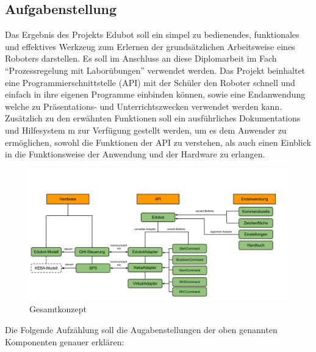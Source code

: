 \subsection{Aufgabenstellung}
Das Ergebnis des Projekts Edubot soll ein simpel zu bedienendes, funktionales und effektives Werkzeug zum Erlernen der grundsätzlichen Arbeitsweise eines Roboters darstellen. Es soll im Anschluss an diese Diplomarbeit im Fach “Prozessregelung mit Laborübungen” verwendet werden. Das Projekt beinhaltet eine Programmierschnittstelle (API) mit der  Schüler den Roboter schnell und einfach in ihre eigenen Programme einbinden können, sowie eine Endanwendung welche zu Präsentations- und Unterrichtszwecken verwendet werden kann.
\\[0.5em]
Zusätzlich zu den erwähnten Funktionen soll ein ausführliches Dokumentations und Hilfesystem m zur Verfügung gestellt werden, um es dem Anwender zu ermöglichen, sowohl die Funktionen der API zu verstehen, als auch einen Einblick in die Funktionsweise der Anwendung und der Hardware zu erlangen.
\\[0.5em]

\begin{figure}[H]
  \centering
  \begin{minipage}[t]{12 cm}
  	\centering
  	\includegraphics[width=12cm]{images/EdubotSystem} 
    \caption{Gesamtkonzept}
  \end{minipage}
\end{figure}
Die Folgende Aufzählung soll die Augabenstellungen der oben genannten Komponenten genauer erklären:
